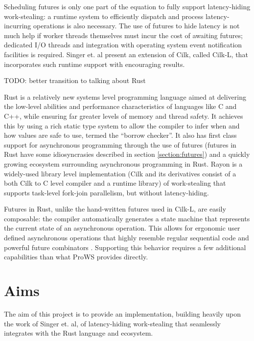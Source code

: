 \documentclass[bsc,frontabs,singlespacing,parskip,deptreport,normalheadings]{infthesis}
\begin{document}
Scheduling futures is only one part of the equation to fully support
latency-hiding work-stealing: a runtime system to efficiently dispatch and
process latency-incurring operations is also necessary. The use of futures to
hide latency is not much help if worker threads themselves must incur the cost
of awaiting futures; dedicated I/O threads and integration with operating system
event notification facilities is required. Singer et. al
\cite{singer_scheduling_2019} present an extension of Cilk, called Cilk-L, that
incorporates such runtime support with encouraging results.

TODO: better transition to talking about Rust

Rust \cite{matsakis_rust_2014} is a relatively new systems level programming
language aimed at delivering the low-level abilities and performance
characteristics of languages like C and C++, while ensuring far greater levels
of memory and thread safety. It achieves this by using a rich static type
system to allow the compiler to infer when and how values are safe to use,
termed the ``borrow checker''. It also has first class support for asynchronous
programming through the use of futures (futures in Rust have some idiosyncrasies
described in section \ref{section:futures}) and a quickly growing
ecosystem surrounding asynchronous programming in Rust. Rayon
\cite{noauthor_baby_nodate, stone_how_2021} is a widely-used library level
implementation (Cilk and its derivatives consist of a both Cilk to C level
compiler and a runtime library) of work-stealing that supports task-level
fork-join parallelism, but without latency-hiding.

Futures in Rust, unlike the hand-written futures used in Cilk-L, are easily
composable: the compiler automatically generates a state machine that represents
the current state of an asynchronous operation. This allows for ergonomic user
defined asynchronous operations that highly resemble regular sequential code and
powerful future combinators \cite{noauthor_futuresfuture_nodate}. Supporting
this behavior requires a few additional capabilities than what ProWS provides
directly.

\section{Aims}

The aim of this project is to provide an implementation, building heavily upon
the work of Singer et. al, of latency-hiding work-stealing that seamlessly
integrates with the Rust language and ecosystem.
\end{document}
